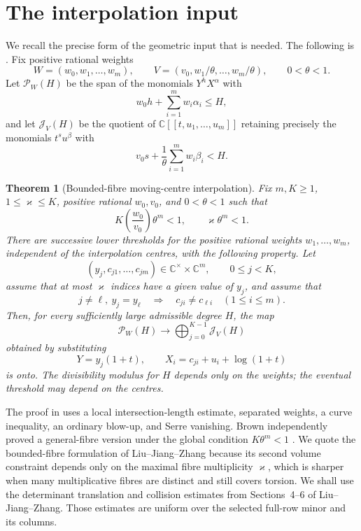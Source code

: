 \documentclass[11pt]{article}
\newcommand{\CC}{\mathbb C}
\newtheorem{theorem}{Theorem}[section]
\theoremstyle{definition}
\theoremstyle{remark}
\numberwithin{equation}{section}
\begin{document}
\section{The interpolation input}\label{sec:interpolation}

We recall the precise form of the geometric input that is needed.  The following is \cite[Theorem~9]{LiuJiangZhang2026}.  Fix
positive rational weights
\[
 W=(w_0,w_1,\ldots,w_m),\qquad
 V=(v_0,w_1/\theta,\ldots,w_m/\theta),
 \qquad 0<\theta<1.
\]
Let $\mathcal P_W(H)$ be the span of the monomials $Y^hX^\alpha$ with
\[
 w_0h+\sum_{i=1}^m w_i\alpha_i\le H,
\]
and let $\mathcal J_V(H)$ be the quotient of
$\CC[[t,u_1,\ldots,u_m]]$ retaining precisely the monomials
$t^su^\beta$ with
\[
 v_0s+\frac1\theta\sum_{i=1}^m w_i\beta_i<H.
\]

\begin{theorem}[Bounded-fibre moving-centre interpolation]\label{thm:MI}
Fix $m,K\ge1$, $1\le\varkappa\le K$, positive rational $w_0,v_0$, and
$0<\theta<1$ such that
\begin{equation}\label{eq:MI-volume}
 K\left(\frac{w_0}{v_0}\right)\theta^m<1,
 \qquad \varkappa\theta^m<1.
\end{equation}
There are successive lower thresholds for the positive rational weights
$w_1,\ldots,w_m$, independent of the interpolation centres, with the
following property.  Let
\[
 (y_j,c_{j1},\ldots,c_{jm})\in\CC^\times\times\CC^m,
 \qquad 0\le j<K,
\]
assume that at most $\varkappa$ indices have a given value of $y_j$, and
assume that
\begin{equation}\label{eq:fibre-separation}
 j\ne\ell,\ y_j=y_\ell
 \quad\Longrightarrow\quad
 c_{ji}\ne c_{\ell i}\quad(1\le i\le m).
\end{equation}
Then, for every sufficiently large admissible degree $H$, the map
\[
 \mathcal P_W(H)\longrightarrow
 \bigoplus_{j=0}^{K-1}\mathcal J_V(H)
\]
obtained by substituting
\[
 Y=y_j(1+t),\qquad
 X_i=c_{ji}+u_i+\log(1+t)
\]
is onto.  The divisibility modulus for $H$ depends only on the weights;
the eventual threshold may depend on the centres.
\end{theorem}

The proof in \cite{LiuJiangZhang2026} uses a local intersection-length
estimate, separated weights, a curve inequality, an ordinary blow-up,
and Serre vanishing.  Brown independently proved a general-fibre version
under the global condition $K\theta^m<1$
\cite[Theorem~2.1]{Brown2026}.  We quote the bounded-fibre formulation
of Liu--Jiang--Zhang because its second volume constraint depends only on
the maximal fibre multiplicity $\varkappa$, which is sharper when many
multiplicative fibres are distinct and still covers torsion.  We shall
use the determinant translation and collision estimates from
Sections~4--6 of Liu--Jiang--Zhang.  Those estimates are uniform over the
selected full-row minor and its columns.
\end{document}
